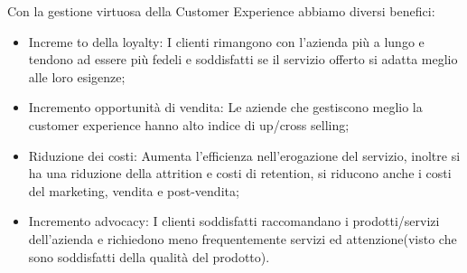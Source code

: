 \documentclass[11pt]{article}
\begin{document}
Con la gestione virtuosa della Customer Experience abbiamo diversi benefici:
\begin{itemize}[topsep=0ex,noitemsep]
	\item Increme to della loyalty: 
	I clienti rimangono con l'azienda più a lungo e tendono ad essere più fedeli e soddisfatti se il servizio offerto si adatta meglio alle loro esigenze;
	\item Incremento opportunità di vendita: 
	Le aziende che gestiscono meglio la customer experience hanno alto indice di up/cross selling;
	\item Riduzione dei costi: 
	Aumenta l'efficienza nell'erogazione del servizio, inoltre si ha una riduzione della attrition e costi di retention, si riducono anche i costi del marketing, vendita e post-vendita;
	\item Incremento advocacy: 
	I clienti soddisfatti raccomandano i prodotti/servizi dell'azienda e richiedono meno frequentemente servizi ed attenzione(visto che sono soddisfatti della qualità del prodotto).
\end{itemize}
\end{document}
